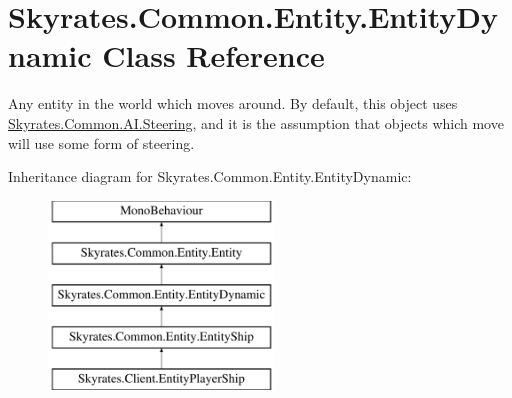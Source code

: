 \hypertarget{class_skyrates_1_1_common_1_1_entity_1_1_entity_dynamic}{\section{Skyrates.\-Common.\-Entity.\-Entity\-Dynamic Class Reference}
\label{class_skyrates_1_1_common_1_1_entity_1_1_entity_dynamic}
}


Any entity in the world which moves around. By default, this object uses \hyperlink{class_skyrates_1_1_common_1_1_a_i_1_1_steering}{Skyrates.\-Common.\-A\-I.\-Steering}, and it is the assumption that objects which move will use some form of steering.  


Inheritance diagram for Skyrates.\-Common.\-Entity.\-Entity\-Dynamic\-:\begin{figure}[H]
\begin{center}
\leavevmode
\includegraphics[height=5.000000cm]{class_skyrates_1_1_common_1_1_entity_1_1_entity_dynamic}
\end{center}
\end{figure}
